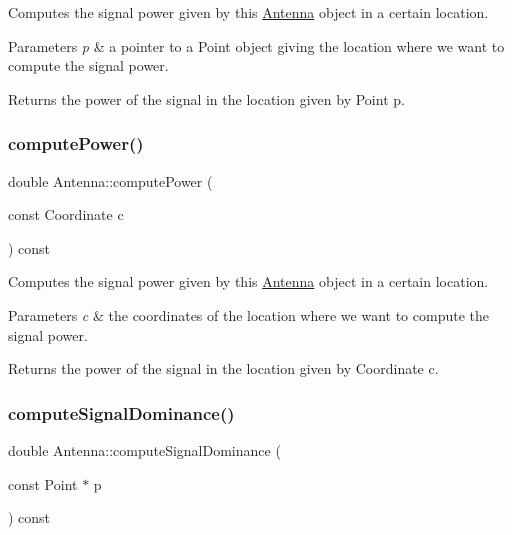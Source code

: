 Computes the signal power given by this \hyperlink{class_antenna}{Antenna} object in a certain location. 
\begin{DoxyParams}{Parameters}
{\em p} & a pointer to a Point object giving the location where we want to compute the signal power. \\
\hline
\end{DoxyParams}
\begin{DoxyReturn}{Returns}
the power of the signal in the location given by Point p. 
\end{DoxyReturn}
\mbox{\label{class_antenna_a0192376f8702c5300fe1f13ce267b305}} 
\subsubsection{\texorpdfstring{compute\+Power()}{computePower()}\hspace{0.1cm}{\footnotesize\ttfamily [2/2]}}
{\footnotesize\ttfamily double Antenna\+::compute\+Power (\begin{DoxyParamCaption}\item[{const Coordinate}]{c }\end{DoxyParamCaption}) const}

Computes the signal power given by this \hyperlink{class_antenna}{Antenna} object in a certain location. 
\begin{DoxyParams}{Parameters}
{\em c} & the coordinates of the location where we want to compute the signal power. \\
\hline
\end{DoxyParams}
\begin{DoxyReturn}{Returns}
the power of the signal in the location given by Coordinate c. 
\end{DoxyReturn}
\mbox{\label{class_antenna_ad5e95089dd452dfee52194d2955a7b76}} 
\subsubsection{\texorpdfstring{compute\+Signal\+Dominance()}{computeSignalDominance()}\hspace{0.1cm}{\footnotesize\ttfamily [1/2]}}
{\footnotesize\ttfamily double Antenna\+::compute\+Signal\+Dominance (\begin{DoxyParamCaption}\item[{const Point $\ast$}]{p }\end{DoxyParamCaption}) const}

